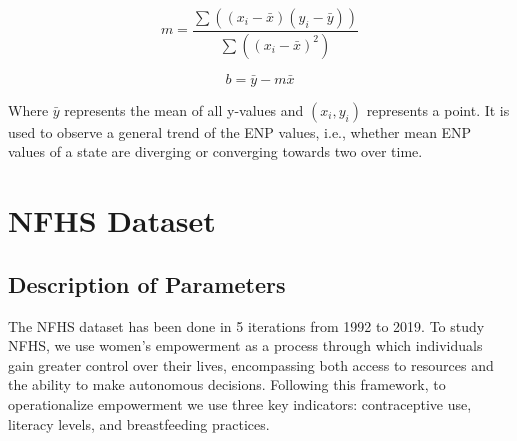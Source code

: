 \begin{equation}
m = \frac{\sum((x_i - \bar{x})(y_i - \bar{y}))}{\sum((x_i - \bar{x})^2)}
\end{equation}

\begin{equation}
b = \bar{y} - m\bar{x}
\end{equation}

Where $\bar{y}$ represents the mean of all y-values and $(x_i,y_i)$ represents a point. It is used to observe a general trend of the ENP values, i.e., whether mean ENP values of a state are diverging or converging towards two over time.

\section{NFHS Dataset}
\subsection{Description of Parameters}
The NFHS dataset has been done in 5 iterations from 1992 to 2019. To study NFHS, we use women's empowerment as a process through which individuals gain greater control over their lives, encompassing both access to resources and the ability to make autonomous decisions. Following this framework, to operationalize empowerment we use three key indicators: contraceptive use, literacy levels, and breastfeeding practices.
